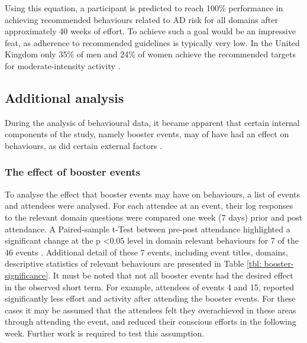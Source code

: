 Using this equation, a participant is predicted to reach 100\% performance in achieving recommended behaviours related to AD risk for all domains after approximately 40 weeks of effort. To achieve such a goal would be an impressive feat, as adherence to recommended guidelines is typically very low. In the United Kingdom only 35\% of men and 24\% of women achieve the recommended targets for moderate-intensity activity \cite{Miles2007}.

\subsection{Additional analysis}
During the analysis of behavioural data, it became apparent that certain internal components of the study, namely booster events, may of have had an effect on behaviours, as did certain external factors \cite{Hartin2015-ICOST}.

\subsubsection{The effect of booster events}
To analyse the effect that booster events may have on behaviours, a list of events and attendees were analysed. For each attendee at an event, their log responses to the relevant domain questions were compared one week (7 days) prior and post attendance. A Paired-sample t-Test between pre-post attendance highlighted a significant change at the p \textless 0.05 level in domain relevant behaviours for 7 of the 46 events \cite{Hartin2015-ICOST}. Additional detail of these 7 events, including event titles, domains, descriptive statistics of relevant behaviours are presented in Table \ref{tbl: booster-significance}. It must be noted that not all booster events had the desired effect in the observed short term. For example, attendees of events 4 and 15, reported significantly less effort and activity after attending the booster events. For these cases it may be assumed that the attendees felt they overachieved in these areas through attending the event, and reduced their conscious efforts in the following week. Further work is required to test this assumption.

